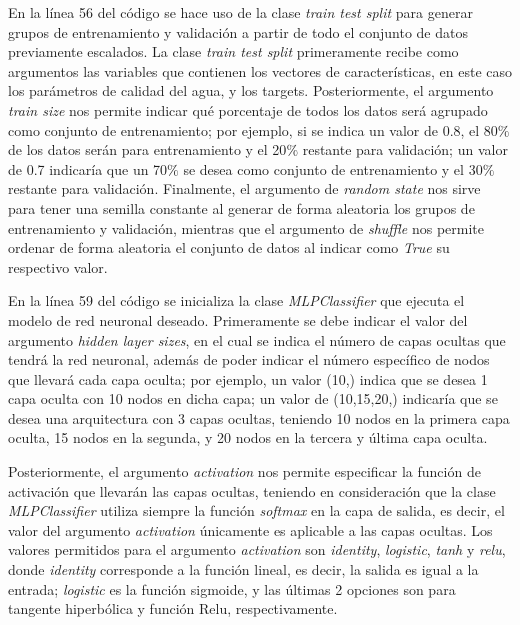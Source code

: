 En la línea 56 del código se hace uso de la clase \textit{train test split} para generar grupos de entrenamiento y validación a partir de todo el conjunto de datos previamente escalados. La clase \textit{train test split} 
primeramente recibe como argumentos las variables que contienen los vectores de características, en este caso los parámetros de calidad del agua, y los targets. Posteriormente, el argumento \textit{train size} nos permite 
indicar qué porcentaje de todos los datos será agrupado como conjunto de entrenamiento; por ejemplo, si se indica un valor de 0.8, el 80$\%$ de los datos serán para entrenamiento y el 20$\%$ restante para validación; un 
valor de 0.7 indicaría que un 70$\%$ se desea como conjunto de entrenamiento y el 30$\%$ restante para validación. Finalmente, el argumento de \textit{random state} nos sirve para tener una semilla constante al generar de 
forma aleatoria los grupos de entrenamiento y validación, mientras que el argumento de \textit{shuffle} nos permite ordenar de forma aleatoria el conjunto de datos al indicar como \textit{True} su respectivo valor.

En la línea 59 del código se inicializa la clase \textit{MLPClassifier} que ejecuta el modelo de red neuronal deseado. Primeramente se debe indicar el valor del argumento \textit{hidden layer sizes}, en el cual se indica 
el número de capas ocultas que tendrá la red neuronal, además de poder indicar el número específico de nodos que llevará cada capa oculta; por ejemplo, un valor (10,) indica que se desea 1 capa oculta con 10 nodos en dicha 
capa; un valor de (10,15,20,) indicaría que se desea una arquitectura con 3 capas ocultas, teniendo 10 nodos en la primera capa oculta, 15 nodos en la segunda, y 20 nodos en la tercera y última capa oculta.

Posteriormente, el argumento \textit{activation} nos permite especificar la función de activación que llevarán las capas ocultas, teniendo en consideración que la clase \textit{MLPClassifier} utiliza siempre la función \textit{softmax}
en la capa de salida, es decir, el valor del argumento \textit{activation} únicamente es aplicable a las capas ocultas. Los valores permitidos para el argumento \textit{activation} son \textit{identity}, \textit{logistic}, 
\textit{tanh} y \textit{relu}, donde \textit{identity} corresponde a la función lineal, es decir, la salida es igual a la entrada; \textit{logistic} es la función sigmoide, y las últimas 2 opciones son para tangente hiperbólica 
y función Relu, respectivamente.

